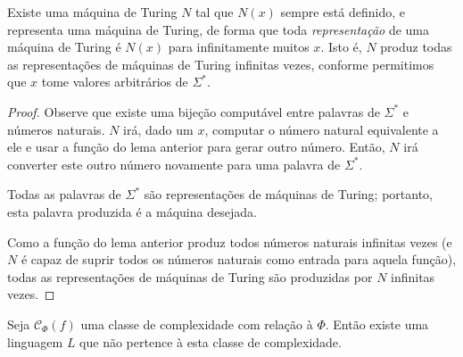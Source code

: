 \begin{lemma}
    Existe uma máquina de Turing $N$
    tal que $N(x)$ sempre está definido,
    e representa uma máquina de Turing,
    de forma que toda \emph{representação}
    de uma máquina de Turing
    é $N(x)$ para infinitamente muitos $x$.
    Isto é, $N$ produz todas as representações de máquinas de Turing
    infinitas vezes,
    conforme permitimos que $x$ tome valores arbitrários de $\Sigma^*$.
\end{lemma}

\begin{proof}
    Observe que existe uma bijeção computável
    entre palavras de $\Sigma^*$
    e números naturais.
    $N$ irá,
    dado um $x$,
    computar o número natural equivalente a ele
    e usar a função do lema anterior
    para gerar outro número.
    Então, $N$ irá converter este outro número
    novamente para uma palavra de $\Sigma^*$.

    Todas as palavras de $\Sigma^*$
    são representações de máquinas de Turing;
    portanto, esta palavra produzida é a máquina desejada.

    Como a função do lema anterior
    produz todos números naturais infinitas vezes
    (e $N$ é capaz de suprir todos os números naturais
    como entrada para aquela função),
    todas as representações de máquinas de Turing
    são produzidas por $N$ infinitas vezes.
\end{proof}

\begin{theorem}
    Seja $\mathcal C_\Phi(f)$ uma classe de complexidade
    com relação à $\Phi$.
    Então existe uma linguagem $L$
    que não pertence à esta classe de complexidade.
\end{theorem}

